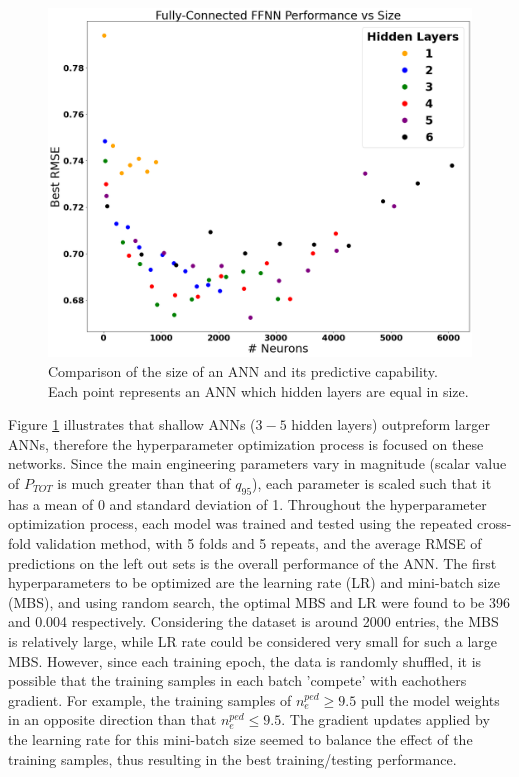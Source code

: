 \documentclass[a4paper, twoside, final, 12pt]{article}
\begin{document}
{\begin{figure}
	\centering
	\includegraphics[scale=0.2]{./src/ANN_performace_size}
	\caption{Comparison of the size of an ANN and its predictive capability. Each point represents an ANN which hidden layers are equal in size.}
	\label{fig:ANN_dim}
\end{figure}
Figure \ref{fig:ANN_dim} illustrates that shallow ANNs ($3-5$ hidden layers) outpreform larger ANNs, therefore the hyperparameter optimization process is focused on these networks. Since the main engineering parameters vary in magnitude (scalar value of $P_{TOT}$ is much greater than that of $q_{95}$), each parameter is scaled such that it has a mean of 0 and standard deviation of 1. Throughout the hyperparameter optimization process, each model was trained and tested using the repeated cross-fold validation method, with 5 folds and 5 repeats, and the average RMSE of predictions on the left out sets is the overall performance of the ANN. The first hyperparameters to be optimized are the learning rate (LR) and mini-batch size (MBS), and using random search, the optimal MBS and LR were found to be 396 and 0.004 respectively. Considering the dataset is around 2000 entries, the MBS is relatively large, while LR rate could be considered very small for such a large MBS. However, since each training epoch, the data is randomly shuffled, it is possible that the training samples in each batch 'compete' with eachothers gradient. For example, the training samples of $n_e^{ped} \geq 9.5$ pull the model weights in an opposite direction than that $n_e^{ped} \leq 9.5$. The gradient updates applied by the learning rate for this mini-batch size seemed to balance the effect of the training samples, thus resulting in the best training/testing performance. 

}
\end{document}
